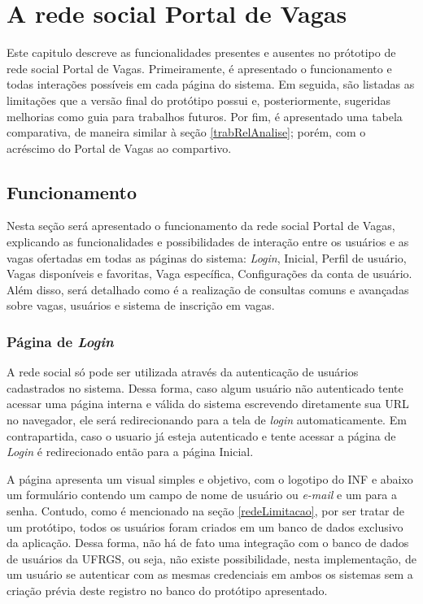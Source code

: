\chapter{A rede social Portal de Vagas}
\label{redeSocialPortal}

Este capitulo descreve as funcionalidades presentes e ausentes no prótotipo de rede social Portal de Vagas. Primeiramente, é apresentado o funcionamento e todas interações possíveis em cada página do sistema. Em seguida, são listadas as limitações que a versão final do protótipo possui e, posteriormente, sugeridas melhorias como guia para trabalhos futuros. Por fim, é apresentado uma tabela comparativa, de maneira similar à seção \ref{trabRelAnalise}; porém, com o acréscimo do Portal de Vagas ao compartivo.

\section{Funcionamento}
\label{PDVFuncionamento}

Nesta seção será apresentado o funcionamento da rede social Portal de Vagas, explicando as funcionalidades e possibilidades de interação entre os usuários e as vagas ofertadas em todas as páginas do sistema: \textit{Login}, Inicial, Perfil de usuário, Vagas disponíveis e favoritas, Vaga específica, Configurações da conta de usuário. Além disso, será detalhado como é a realização de consultas comuns e avançadas sobre vagas, usuários e sistema de inscrição em vagas.

\subsection{Página de \textit{Login}}
\label{PDVFunLogin}

A rede social só pode ser utilizada através da autenticação de usuários cadastrados no sistema. Dessa forma, caso algum usuário não autenticado tente acessar uma página interna e válida do sistema escrevendo diretamente sua URL no navegador, ele será redirecionando para a tela de \textit{login} automaticamente. Em contrapartida, caso o usuario já esteja autenticado e tente acessar a página de \textit{Login} é redirecionado então para a página Inicial.

A página apresenta um visual simples e objetivo, com o logotipo do INF e abaixo um formulário contendo um campo de nome de usuário ou \textit{e-mail} e um para a senha. Contudo, como é mencionado na seção \ref{redeLimitacao}, por ser tratar de um protótipo, todos os usuários foram criados em um banco de dados exclusivo da aplicação. Dessa forma, não há de fato uma integração com o banco de dados de usuários da UFRGS, ou seja, não existe possibilidade, nesta implementação, de um usuário se autenticar com as mesmas credenciais em ambos os sistemas sem a criação prévia deste registro no banco do protótipo apresentado. 

